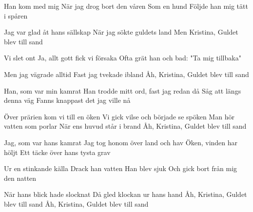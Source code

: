 \medskip

\begin{guitar}
  Han kom med mig
  När jag drog bort den våren
  Som en hund
  Följde han mig tätt i spåren

  Jag var glad åt hans sällskap
  När jag sökte guldets land
  Men Kristina, Guldet blev till sand

  Vi slet ont
  Ja, allt gott fick vi försaka
  Ofta grät han och bad:
  "Ta mig tillbaka"

  Men jag vägrade alltid
  Fast jag tvekade ibland
  Åh, Kristina, Guldet blev till sand

  Han, som var min kamrat
  Han trodde mitt ord, fast jag redan då
  Såg att längs denna väg
  Fanns knappast det jag ville nå

  Över prärien kom vi till en öken
  Vi gick vilse och började se spöken
  Man hör vatten som porlar
  När ens huvud står i brand
  Åh, Kristina, Guldet blev till sand

  Jag, som var hans kamrat
  Jag tog honom över land och hav
  Öken, vinden har höljt
  Ett täcke över hans tysta grav

  Ur en stinkande källa
  Drack han vatten
  Han blev sjuk
  Och gick bort från mig den natten

  När hans blick hade slocknat
  Då gled klockan ur hans hand
  Åh, Kristina, Guldet blev till sand
  Åh, Kristina, Guldet blev till sand
\end{guitar}

